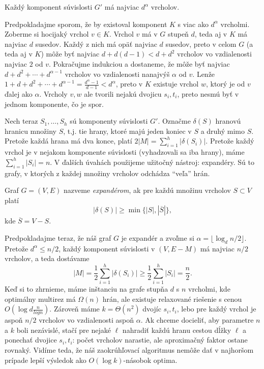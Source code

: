 \begin{lema}
  Každý komponent súvislosti $G'$ má najviac $d^\alpha$ vrcholov.
\end{lema}
\begin{dokaz}
  Predpokladajme sporom, že by existoval komponent $K$ s viac ako $d^\alpha$ vrcholmi. Zoberme si hocijaký 
  vrchol $v\in K$. Vrchol $v$ má v $G$ stupeň $d$, teda aj v $K$ má najviac $d$ susedov. Každý z nich 
  má opäť najviac $d$ susedov, preto v celom $G$ (a teda aj v $K$) môže byť najviac $d+d(d-1)<d+d^2$ vrcholov
  vo vzdialenosti najviac $2$ od $v$. Pokračujme indukciou a dostaneme, že môže byť
  najviac $d+d^2+\cdots+d^{\alpha-1}$ vrcholov vo vzdialenosti nanajvýš $\alpha$ od $v$.
  Lenže $1+d+d^2+\cdots+d^{\alpha-1}=\frac{d^\alpha-1}{d-1}<d^\alpha$, preto v $K$ existuje vrchol $w$, ktorý
  je od $v$ ďalej ako $\alpha$. Vrcholy  $v,w$ ale tvorili nejakú dvojicu $s_i, t_i$, 
  preto nesmú byť v jednom komponente, čo je 
  spor.
\end{dokaz}

\noindent
Nech teraz $S_1,\ldots,S_h$ sú komponenty súvislosti $G'$. 
Označme $\delta(S)$ hranovú hranicu množiny $S$, t.j. tie hrany, ktoré majú jeden koniec v $S$ a druhý mimo $S$.
Pretože každá hrana má dva konce, platí $2|M|=\sum_{i=1}^h|\delta(S_i)|$. Pretože každý vrchol je v nejakom komponente
súvislosti (vyhadzovali sa iba hrany), máme $\sum_{i=1}^h|S_i|=n$.
V ďalších  úvahách použijeme užitočný nástroj: expandéry. Sú to grafy, v ktorých z každej množiny vrcholov
odchádza ``veľa'' hrán.

\noindent
\begin{framed}
  \begin{dfn}
    Graf $G=(V,E)$ nazveme {\em expandérom}, ak pre každú množinu vrcholov $S\subset V$ platí
    $$|\delta(S)|\ge\min \{ |S|, |\overline{S}|\},$$
    kde $\overline{S}=V-S$. 
  \end{dfn}
\end{framed}

\noindent
Predpokladajme teraz, že náš graf $G$ je expandér a zvoľme si $\alpha=\lfloor\log_d n/2\rfloor$. Pretože
$d^\alpha\le n/2$, každý komponent súvislosti v $(V,E-M)$ má najviac $n/2$ vrcholov, a teda dostávame
$$|M|=\frac{1}{2}\sum_{i=1}^h|\delta(S_i)|\ge\frac{1}{2}\sum_{i=1}^h|S_i|=\frac{n}{2}.$$
Keď si to zhrnieme, máme inštanciu na grafe stupňa $d$ s $n$ vrcholmi, kde optimálny multirez má $\Omega(n)$
hrán, ale existuje relaxované riešenie  s cenou $O\left(\log d\frac{n}{log n}\right)$. Zároveň máme
$k=\Theta(n^2)$ dvojíc $s_i,t_i$, lebo pre každý vrchol je aspoň $n/2$ vrcholov vo vzdialenosti aspoň $\alpha$.
Ak chceme docieliť, aby parametre $n$ a $k$ boli nezávislé, stačí pre nejaké $\ell$ nahradiť 
každú hranu cestou dĺžky $\ell$ a ponechať dvojice $s_i, t_i$: počet vrcholov narastie, ale aproximačný
faktor ostane rovnaký. Vidíme teda, že náš zaokrúhľovací algoritmus nemôže dať v najhoršom prípade
lepší výsledok ako $O(\log k)$-násobok optima.

